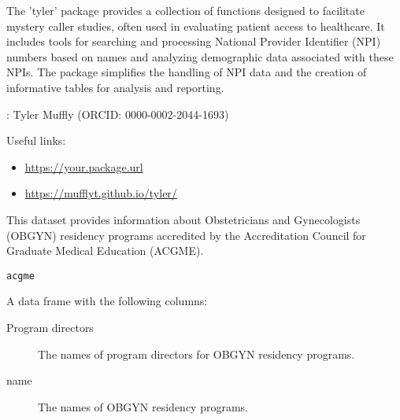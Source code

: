 \documentclass[a4paper]{book}
\begin{document}
%
\begin{Description}
The 'tyler' package provides a collection of functions designed to facilitate mystery caller studies, often used in evaluating patient access to healthcare. It includes tools for searching and processing National Provider Identifier (NPI) numbers based on names and analyzing demographic data associated with these NPIs. The package simplifies the handling of NPI data and the creation of informative tables for analysis and reporting.
\end{Description}
%
\begin{Author}
: Tyler Muffly  (ORCID: 0000-0002-2044-1693)

\end{Author}
%
\begin{SeeAlso}
Useful links:
\begin{itemize}

\item{} \url{https://your.package.url}
\item{} \url{https://mufflyt.github.io/tyler/}

\end{itemize}


\end{SeeAlso}
%
\begin{Description}
This dataset provides information about Obstetricians and Gynecologists (OBGYN) residency programs accredited by the Accreditation Council for Graduate Medical Education (ACGME).
\end{Description}
%
\begin{Usage}
\begin{verbatim}
acgme
\end{verbatim}
\end{Usage}
%
\begin{Format}
A data frame with the following columns:
\begin{description}

\item[Program directors] The names of program directors for OBGYN residency programs.
\item[name] The names of OBGYN residency programs.

\end{description}

\end{Format}
\end{document}
